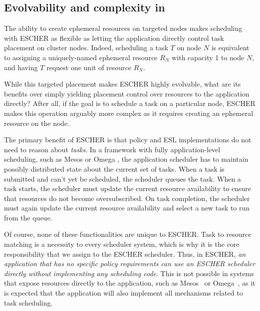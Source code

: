 \subsection{Evolvability and complexity in \name{}}
\label{sec:arch:evolve}
The ability to create ephemeral resources on targeted nodes makes scheduling with ESCHER as flexible as letting the application directly
control task placement on cluster nodes. %
Indeed, scheduling a task $T$ on node $N$ is equivalent to assigning a uniquely-named ephemeral resource $R_N$ with capacity 1 to node $N$, and having $T$ request one unit of resource $R_N$. 


While this targeted placement makes ESCHER highly evolvable, what are its benefits over simply
yielding placement control over resources to the application directly?
After all, if the goal is to schedule a task on a particular node, ESCHER makes this operation arguably more complex as it requires creating an ephemeral resource on the node.%

The primary benefit of ESCHER is that policy and ESL implementations do not need to reason about \emph{tasks}.
In a framework with fully application-level scheduling, such as Mesos or Omega \cite{mesos, omega}, the application scheduler has to maintain possibly distributed state about the current set of tasks.
When a task is submitted and can't yet be scheduled, the scheduler queues the task.
When a task starts, the scheduler must update the current resource availability to ensure that resources do not become oversubscribed.
On task completion, the scheduler must again update the current resource availability and select a new task to run from the queue.

Of course, none of these functionalities are unique to ESCHER.
Task to resource matching is a necessity to every scheduler system, which is why it is the core responsibility that we assign to the ESCHER scheduler.
Thus, in ESCHER, \emph{an application that has no specific policy requirements can use an ESCHER scheduler directly without implementing any scheduling code}.
This is not possible in systems that expose resources directly to the application, such as Mesos~\cite{mesos} or Omega~\cite{omega}, as it is expected that the application will also implement all mechanisms related to task scheduling.

